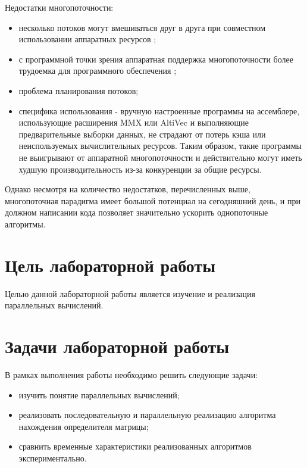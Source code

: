 \documentclass[12pt]{report}
\begin{document}
    Недостатки многопоточности:

    \begin{itemize}
        \item несколько потоков могут вмешиваться друг в друга при совместном
        использовании аппаратных ресурсов \cite{Nemirovsky};
        \item с программной точки зрения аппаратная поддержка многопоточности
        более трудоемка для программного обеспечения \cite{Olukotun};
        \item проблема планирования потоков;
        \item специфика использования - вручную настроенные программы на ассемблере,
        использующие расширения MMX или AltiVec и выполняющие предварительные выборки данных,
        не страдают от потерь кэша или неиспользуемых вычислительных ресурсов.
        Таким образом, такие программы не выигрывают от аппаратной многопоточности
        и действительно могут иметь худшую производительность из-за конкуренции за общие ресурсы.
    \end{itemize}

    Однако несмотря на количество недостатков, перечисленных выше,
    многопоточная парадигма имеет большой потенциал на сегодняшний день,
    и при должном написании кода позволяет значительно ускорить однопоточные алгоритмы.

    \section*{Цель лабораторной работы}
    Целью данной лабораторной работы является изучение и реализация параллельных вычислений.

    \section*{Задачи лабораторной работы}
    В рамках выполнения работы необходимо решить следующие задачи:

    \begin{itemize}
        \item изучить понятие параллельных вычислений;
        \item реализовать последовательную и параллельную реализацию алгоритма нахождения определителя матрицы;
        \item сравнить временные характеристики реализованных алгоритмов экспериментально.
    \end{itemize}
\end{document}
